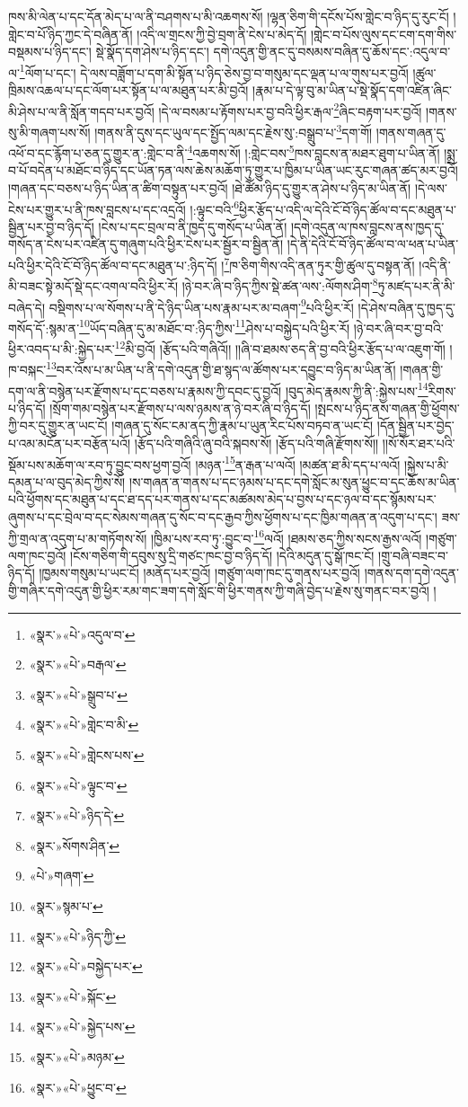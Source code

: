 ཁས་མི་ལེན་པ་དང་དོན་མེད་པ་ལ་ནི་བཤགས་པ་མི་འཆགས་སོ། །ལྷན་ཅིག་གི་དངོས་པོས་གླེང་བ་ཉིད་དུ་རུང་ངོ། །གླེང་བ་པོ་ཉིད་ཀྱང་དེ་བཞིན་ནོ། །འདི་ལ་གྲངས་ཀྱི་བྱེ་བྲག་ནི་ངེས་པ་མེད་དོ། །གླེང་བ་པོས་ལུས་དང་ངག་དག་གིས་བསྡམས་པ་ཉིད་དང་། སྡེ་སྣོད་དག་ཤེས་པ་ཉིད་དང་། དགེ་འདུན་གྱི་ནང་དུ་བསམས་བཞིན་དུ་ཆོས་དང་:འདུལ་བ་ལ་\footnote{«སྣར་»«པེ་»འདུལ་བ་}ལོག་པ་དང་། དེ་ལས་བཟློག་པ་དག་མི་སྟོན་པ་ཉིད་ཅེས་བྱ་བ་གསུམ་དང་ལྡན་པ་ལ་གུས་པར་བྱའོ། །ཚུལ་ཁྲིམས་འཆལ་པ་དང་ལོག་པར་སྟོན་པ་ལ་མཐུན་པར་མི་བྱའོ། །རྣམ་པ་དེ་ལྟ་བུ་མ་ཡིན་པ་སྡེ་སྣོད་དག་འཛིན་ཞིང་མི་ཤེས་པ་ལ་ནི་སློན་གདབ་པར་བྱའོ། །དེ་ལ་བསམ་པ་རྟོགས་པར་བྱ་བའི་ཕྱིར་རྒལ་\footnote{«སྣར་»«པེ་»བརྒལ་}ཞིང་བརྟག་པར་བྱའོ། །གནས་སུ་མི་གཞག་པས་སོ། །གནས་ནི་དུས་དང་ཡུལ་དང་སྤྱོད་ལམ་དང་རྗེས་སུ་:བསྒྲུབ་པ་\footnote{«སྣར་»«པེ་»སྒྲུབ་པ་}དག་གོ། །གནས་གཞན་དུ་འཕོ་བ་དང་རྙོག་པ་ཅན་དུ་གྱུར་ན་:གླེང་བ་ནི་\footnote{«སྣར་»«པེ་»གླེང་བ་མི་}འཆགས་སོ། །:གླེང་བས་\footnote{«སྣར་»«པེ་»གླེངས་པས་}ཁས་བླངས་ན་མཐར་ཐུག་པ་ཡིན་ནོ། །སྨྲ་བ་པོ་བདེན་པ་མཐོང་བ་ཉིད་དང་ཡོན་ཏན་ལས་ཆེས་མཆོག་ཏུ་གྱུར་པ་ཁྱིམ་པ་ཡིན་ཡང་རུང་གཞན་ཚད་མར་བྱའོ། །གཞན་དང་བཅས་པ་ཉིད་ཡིན་ན་ཚིག་བསྟུན་པར་བྱའོ། །ཐེ་ཚོམ་ཉིད་དུ་གྱུར་ན་ཤེས་པ་ཉིད་མ་ཡིན་ནོ། །དེ་ལས་ངེས་པར་གྱུར་པ་ནི་ཁས་བླངས་པ་དང་འདྲའོ། །:ལྟུང་བའི་\footnote{«སྣར་»«པེ་»ལྟུང་བ་}ཕྱིར་རྩོད་པ་འདི་ལ་དེའི་ངོ་བོ་ཉིད་ཚོལ་བ་དང་མཐུན་པ་སྦྱིན་པར་བྱ་བ་ཉིད་དོ། །ངེས་པ་དང་བྲལ་བ་ནི་ཁྱད་དུ་གསོད་པ་ཡིན་ནོ། །དགེ་འདུན་ལ་ཁས་བླངས་ནས་ཁྱད་དུ་གསོད་ན་ངེས་པར་འཛིན་དུ་གཞུག་པའི་ཕྱིར་ངེས་པར་སྦྱོར་བ་སྦྱིན་ནོ། །དེ་ནི་དེའི་ངོ་བོ་ཉིད་ཚོལ་བ་ལ་ཕན་པ་ཡིན་པའི་ཕྱིར་དེའི་ངོ་བོ་ཉིད་ཚོལ་བ་དང་མཐུན་པ་:ཉིད་དོ། །\footnote{«སྣར་»«པེ་»ཉིད་དེ་}ཁ་ཅིག་གིས་འདི་ནན་ཏུར་གྱི་ཚུལ་དུ་བསྟན་ནོ། །འདི་ནི་མི་བཟང་སྟེ་མདོ་སྡེ་དང་འགལ་བའི་ཕྱིར་རོ། །ཉེ་བར་ཞི་བ་ཉིད་ཀྱིས་སྡེ་ཚན་ལས་:ལོགས་ཤིག་\footnote{«སྣར་»སོགས་ཤིན་}ཏུ་མཛད་པར་ནི་མི་བཞེད་དེ། བསྡིགས་པ་ལ་སོགས་པ་ནི་དེ་ཉིད་ཡིན་པས་རྣམ་པར་མ་བཞག་\footnote{«པེ་»གཞག་}པའི་ཕྱིར་རོ། །དེ་ཤེས་བཞིན་དུ་ཁྱད་དུ་གསོད་དོ་:སྙམ་ན་\footnote{«སྣར་»སྙམ་པ་}ཡོད་བཞིན་དུ་མ་མཐོང་བ་:ཉིད་ཀྱིས་\footnote{«སྣར་»«པེ་»ཉིད་ཀྱི་}ཤེས་པ་བསྐྱེད་པའི་ཕྱིར་རོ། །ཉེ་བར་ཞི་བར་བྱ་བའི་ཕྱིར་འབད་པ་མི་:སྐྱེད་པར་\footnote{«སྣར་»«པེ་»བསྐྱེད་པར་}མི་བྱའོ། །རྩོད་པའི་གཞིའོ།། །།ཞི་བ་ཐམས་ཅད་ནི་བྱ་བའི་ཕྱིར་རྩོད་པ་ལ་འཇུག་གོ། །ཁ་བསྐང་\footnote{«སྣར་»«པེ་»སྐོང་}བར་འོས་པ་མ་ཡིན་པ་ནི་དགེ་འདུན་གྱི་ཐ་སྙད་ལ་ཚོགས་པར་དབྱུང་བ་ཉིད་མ་ཡིན་ནོ། །གཞན་གྱི་དག་ལ་ནི་བསྙེན་པར་རྫོགས་པ་དང་བཅས་པ་རྣམས་ཀྱི་དབང་དུ་བྱའོ། །བུད་མེད་རྣམས་ཀྱི་ནི་:སྐྱེས་པས་\footnote{«སྣར་»«པེ་»སྐྱེད་པས་}རིགས་པ་ཉིད་དོ། །སྲོག་གམ་བསྙེན་པར་རྫོགས་པ་ལས་ཉམས་ན་ཉེ་བར་ཞི་བ་ཉིད་དོ། །སྤངས་པ་ཉིད་ནས་གཞན་གྱི་ཕྱོགས་ཀྱི་བར་དུ་གྱུར་ན་ཡང་ངོ། །གཞན་དུ་སོང་ངམ་ནད་ཀྱི་རྣམ་པ་ཡུན་རིང་པོས་བཏབ་ན་ཡང་ངོ། །དོན་སྦྱིན་པར་བྱེད་པ་འམ་མངོན་པར་བརྩོན་པའོ། །རྩོད་པའི་གཞིའི་ཞུ་བའི་སྐབས་སོ། །རྩོད་པའི་གཞི་རྫོགས་སོ།། །།སོ་སོར་ཐར་པའི་སྡོམ་པས་མཆོག་ལ་རབ་ཏུ་བྱུང་བས་ཕྱག་བྱའོ། །མཉན་\footnote{«སྣར་»«པེ་»མཉམ་}ན་རྒན་པ་ལའོ། །མཚན་ཐ་མི་དད་པ་ལའོ། །སྐྱེས་པ་མི་དམན་པ་ལ་བུད་མེད་ཀྱིས་སོ། །ས་གཞན་ན་གནས་པ་དང་ཉམས་པ་དང་དགེ་སློང་མ་སུན་ཕྱུང་བ་དང་ཆོས་མ་ཡིན་པའི་ཕྱོགས་དང་མཐུན་པ་དང་ཐ་དད་པར་གནས་པ་དང་མཚམས་མེད་པ་བྱས་པ་དང་ཉལ་བ་དང་སྙོམས་པར་ཞུགས་པ་དང་བྲེལ་བ་དང་སེམས་གཞན་དུ་སོང་བ་དང་རྒྱབ་ཀྱིས་ཕྱོགས་པ་དང་ཁྱིམ་གཞན་ན་འདུག་པ་དང་། ཟས་ཀྱི་གྲལ་ན་འདུག་པ་མ་གཏོགས་སོ། །ཁྱིམ་པས་རབ་ཏུ་:བྱུང་བ་\footnote{«སྣར་»«པེ་»ཕྱུང་བ་}ལའོ། །ཐམས་ཅད་ཀྱིས་སངས་རྒྱས་ལའོ། །གཙུག་ལག་ཁང་བྱའོ། །ངོས་གཅིག་གི་དབུས་སུ་དྲི་གཙང་ཁང་བྱ་བ་ཉིད་དོ། །དེའི་མདུན་དུ་སྒོ་ཁང་ངོ། །གྲུ་བཞི་བཟང་བ་ཉིད་དོ། །ཁྱམས་གསུམ་པ་ཡང་ངོ། །མནོད་པར་བྱའོ། །གཙུག་ལག་ཁང་དུ་གནས་པར་བྱའོ། །གནས་དག་དགེ་འདུན་གྱི་གཞིར་དགེ་འདུན་གྱི་ཕྱིར་རམ་གང་ཟག་དགེ་སློང་གི་ཕྱིར་གནས་ཀྱི་གཞི་བྱེད་པ་རྗེས་སུ་གནང་བར་བྱའོ། །
